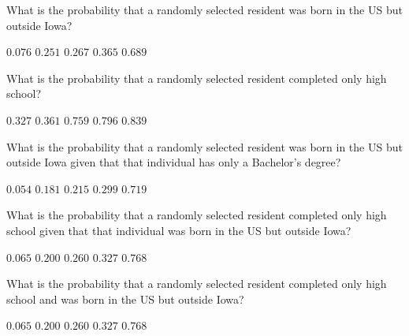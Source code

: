 \documentclass[answers,12pt]{exam}
\begin{document}
\begin{questions}

\question\label{FirstIowa} What is the probability that a randomly selected
resident was born in the US but outside Iowa?\\
\begin{oneparchoices}
\choice $0.076$ %
\correctchoice $0.251$
\choice $0.267$ %
\choice $0.365$ %
\choice $0.689$ %
\end{oneparchoices}

\question What is the probability that a randomly selected
resident completed only high school?\\
\begin{oneparchoices}
\correctchoice $0.327$
\choice $0.361$ %
\choice $0.759$ %
\choice $0.796$ %
\choice $0.839$ %
\end{oneparchoices}

\question What is the probability that a randomly selected
resident was born in the US but outside Iowa given that
that individual has only a Bachelor's degree?\\
\begin{oneparchoices}
\choice $0.054$ %
\choice $0.181$ %
\choice $0.215$ %
\correctchoice $0.299$
\choice $0.719$ %
\end{oneparchoices}

\question What is the probability that a randomly selected
resident completed only high school given that
that individual was born in the US but outside Iowa?\\
\begin{oneparchoices}
\choice $0.065$ %
\choice $0.200$ %
\correctchoice $0.260$
\choice $0.327$ %
\choice $0.768$ %
\end{oneparchoices}

\question What is the probability that a randomly selected
resident completed only high school and was born
in the US but outside Iowa?\\
\begin{oneparchoices}
\correctchoice $0.065$
\choice $0.200$ %
\choice $0.260$ %
\choice $0.327$ %
\choice $0.768$ %
\end{oneparchoices}


\end{questions}
\end{document}

